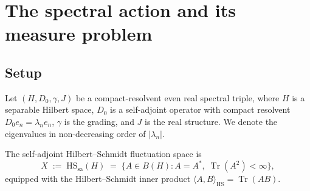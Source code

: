 \documentclass[12pt,a4paper]{article}
\theoremstyle{plain}
\theoremstyle{definition}
\theoremstyle{remark}
\newcommand{\Tr}{\operatorname{Tr}}
\newcommand{\HS}{\mathrm{HS}}
\newcommand{\sa}{\mathrm{sa}}
\begin{document}
\section{The spectral action and its measure problem}
\label{sec:measure-problem}

\subsection{Setup}

Let $(H, D_0, \gamma, J)$ be a compact-resolvent even real spectral
triple, where $H$ is a separable Hilbert space, $D_0$ is a self-adjoint
operator with compact resolvent $D_0 e_n = \lambda_n e_n$, $\gamma$ is
the grading, and $J$ is the real structure.  We denote the eigenvalues in
non-decreasing order of $|{\lambda_n}|$.

The self-adjoint Hilbert--Schmidt fluctuation space is
\begin{equation}\label{eq:HS-space}
  X \;:=\; \HS_\sa(H) \;=\;
  \bigl\{A \in B(H) : A = A^*,\;\Tr(A^2) < \infty\bigr\},
\end{equation}
equipped with the Hilbert--Schmidt inner product
$\langle A, B\rangle_{\HS} = \Tr(AB)$.
\end{document}
